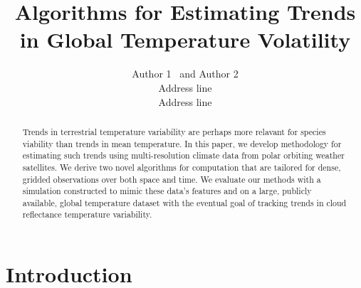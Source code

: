 \documentclass[letterpaper]{article} %
\begin{document}
 

\title{Algorithms for Estimating Trends in Global Temperature Volatility}

\author{Author 1 \ and Author 2\\
Address line\\
Address line
}





\maketitle


\begin{abstract}
Trends in terrestrial temperature variability are perhaps more relavant for species
viability than trends in mean
temperature. In this paper, we develop methodology for estimating such
trends using multi-resolution climate data from polar orbiting weather
satellites. We derive two novel algorithms for computation that are
tailored for dense, gridded observations over both 
space and time. We evaluate our methods with a simulation constructed
to mimic these data's 
features and on a large, publicly available, global
temperature dataset with the eventual goal of tracking trends in
cloud reflectance temperature variability.
\end{abstract}



\section{Introduction}

\end{document}
